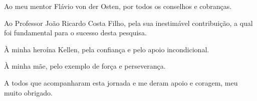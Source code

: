\documentclass[../thesis.tex]{subfiles}
\begin{document}
\begin{spacing}{1.1}
	Ao meu mentor Flávio von der Osten, por todos os conselhos e cobranças.
	
	Ao Professor João Ricardo Costa Filho, pela sua inestimável contribuição, a qual foi fundamental para o sucesso desta pesquisa.
	
	À minha heroína Kellen, pela confiança e pelo apoio incondicional.
	
	À minha mãe, pelo exemplo de força e perseverança.
	
	A todos que acompanharam esta jornada e me deram apoio e coragem, meu muito obrigado.
	
	\end{spacing}
	
	\thispagestyle{empty}
\end{document}
